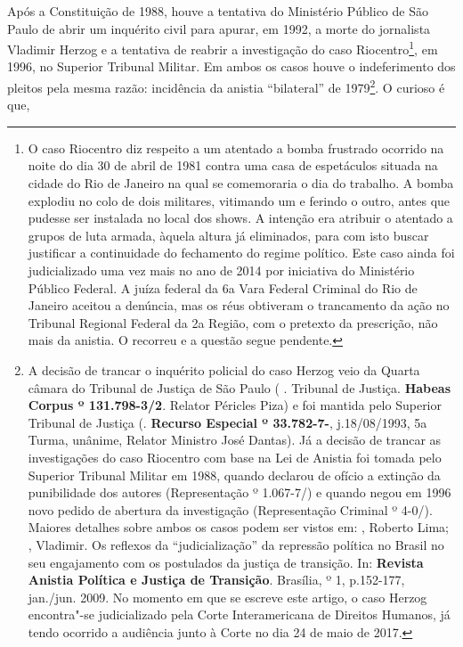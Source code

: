 Após a Constituição de 1988, houve a tentativa do Ministério Público de
São Paulo de abrir um inquérito civil para apurar, em 1992, a morte do
jornalista Vladimir Herzog e a tentativa de reabrir a investigação do
caso Riocentro\footnote{O caso Riocentro diz respeito a um atentado a
  bomba frustrado ocorrido na noite do dia 30 de abril de 1981 contra
  uma casa de espetáculos situada na cidade do Rio de Janeiro na qual se
  comemoraria o dia do trabalho. A bomba explodiu no colo de dois
  militares, vitimando um e ferindo o outro, antes que pudesse ser
  instalada no local dos shows. A intenção era atribuir o atentado a
  grupos de luta armada, àquela altura já eliminados, para com isto
  buscar justificar a continuidade do fechamento do regime político.
  Este caso ainda foi judicializado uma vez mais no ano de 2014 por
  iniciativa do Ministério Público Federal. A juíza federal da 6a Vara
  Federal Criminal do Rio de Janeiro aceitou a denúncia, mas os réus
  obtiveram o trancamento da ação no Tribunal Regional Federal da 2a
  Região, com o pretexto da prescrição, não mais da anistia. O 
  recorreu e a questão segue pendente.}, em 1996, no Superior Tribunal
Militar. Em ambos os casos houve o indeferimento dos pleitos pela mesma
razão: incidência da anistia ``bilateral'' de 1979\footnote{A decisão de
  trancar o inquérito policial do caso Herzog veio da Quarta câmara do
  Tribunal de Justiça de São Paulo ( . Tribunal de Justiça.
  \textbf{Habeas Corpus º 131.798-3/2}. Relator Péricles Piza) e foi
  mantida pelo Superior Tribunal de Justiça (. \textbf{Recurso Especial º 33.782-7-}, j.18/08/1993, 5a
  Turma, unânime, Relator Ministro José Dantas). Já a decisão de trancar
  as investigações do caso Riocentro com base na Lei de Anistia foi
  tomada pelo Superior Tribunal Militar em 1988, quando declarou de
  ofício a extinção da punibilidade dos autores (Representação º
  1.067-7/) e quando negou em 1996 novo pedido de abertura da
  investigação (Representação Criminal º 4-0/). Maiores detalhes
  sobre ambos os casos podem ser vistos em: , Roberto Lima; 
  , Vladimir. Os reflexos da ``judicialização'' da repressão política
  no Brasil no seu engajamento com os postulados da justiça de
  transição. In: \textbf{Revista Anistia Política e Justiça de
  Transição}. Brasília, º 1, p.152-177, jan./jun. 2009. No momento em
  que se escreve este artigo, o caso Herzog encontra"-se judicializado
  pela Corte Interamericana de Direitos Humanos, já tendo ocorrido a
  audiência junto à Corte no dia 24 de maio de 2017.}. O curioso é que,
